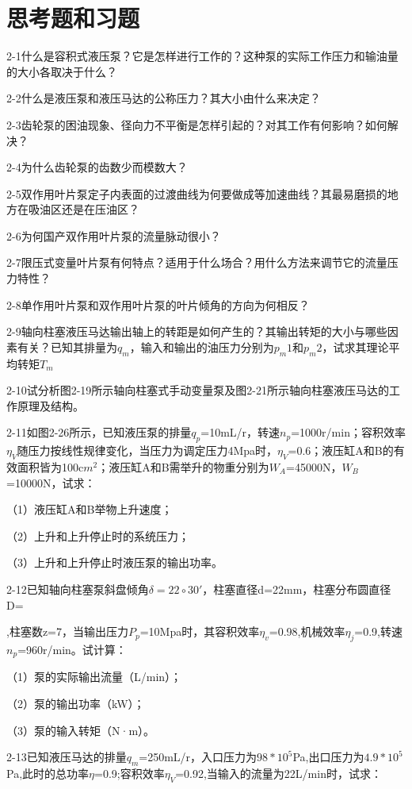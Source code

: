 
\section{思考题和习题}


2-1什么是容积式液压泵？它是怎样进行工作的？这种泵的实际工作压力和输油量的大小各取决于什么？

2-2什么是液压泵和液压马达的公称压力？其大小由什么来决定？

2-3齿轮泵的困油现象、径向力不平衡是怎样引起的？对其工作有何影响？如何解决？

2-4为什么齿轮泵的齿数少而模数大？

2-5双作用叶片泵定子内表面的过渡曲线为何要做成等加速曲线？其最易磨损的地方在吸油区还是在压油区？

2-6为何国产双作用叶片泵的流量脉动很小？

2-7限压式变量叶片泵有何特点？适用于什么场合？用什么方法来调节它的流量压力特性？

2-8单作用叶片泵和双作用叶片泵的叶片倾角的方向为何相反？

2-9轴向柱塞液压马达输出轴上的转距是如何产生的？其输出转矩的大小与哪些因素有关？已知其排量为$q_m$，输入和输出的油压力分别为$p_m1$和$p_m2$，试求其理论平均转矩$T_m$

2-10试分析图2-19所示轴向柱塞式手动变量泵及图2-21所示轴向柱塞液压马达的工作原理及结构。

2-11如图2-26所示，已知液压泵的排量$q_p$=10mL/r，转速$n_p$=1000r/min；容积效率$\eta_V$随压力按线性规律变化，当压力为调定压力4Mpa时，$\eta_V$=0.6；液压缸A和B的有效面积皆为100c$m^2$；液压缸A和B需举升的物重分别为$W_A$=45000N，$W_B$=10000N，试求：

（1）液压缸A和B举物上升速度；

（2）上升和上升停止时的系统压力；

（3）上升和上升停止时液压泵的输出功率。

2-12已知轴向柱塞泵斜盘倾角$\delta =22\circ30'$，柱塞直径d=22mm，柱塞分布圆直径D=

\newpage
\noindent
68mm,柱塞数z=7，当输出压力$P_p$=10Mpa时，其容积效率$\eta_v$=0.98,机械效率$\eta_j$=0.9,转速$n_p$=960r/min。试计算：

（1）泵的实际输出流量（L/min）；

（2）泵的输出功率（kW）；

（3）泵的输入转矩（N·m）。

2-13已知液压马达的排量$q_m$=250mL/r，入口压力为$98*10^5$Pa,出口压力为$4.9*10^5$Pa,此时的总功率$\eta$=0.9;容积效率$\eta_V$=0.92,当输入的流量为22L/min时，试求：

